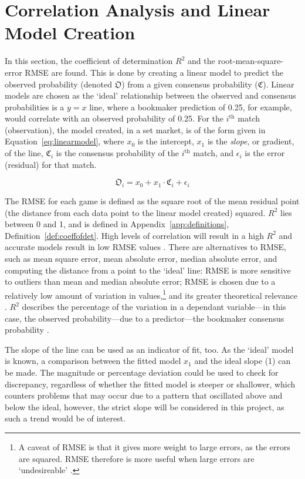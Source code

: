 \documentclass[a4paper,10pt]{report}
\begin{document}
\section{Correlation Analysis and Linear Model Creation}\label{sec:elitecorr}
In this section, the coefficient of determination $R^2$ and the root-mean-square-error RMSE are found. This is done by creating a linear model to predict the observed probability (denoted $\mathfrak{O}$) from a given consensus probability ($\mathfrak{C}$). Linear models are chosen as the `ideal' relationship between the observed and consensus probabilities is a $y=x$ line, where a bookmaker prediction of 0.25, for example, would correlate with an observed probability of 0.25. For the $i^{\textrm{th}}$ match (observation), the model created, in a set market, is of the form given in Equation~\ref{eq:linearmodel}, where $x_0$ is the intercept, $x_1$ is the \textit{slope}, or gradient, of the line, $\mathfrak{C}_i$ is the consensus probability of the $i^{\textrm{th}}$ match, and $\epsilon_i$ is the error (residual) for that match.

\begin{equation}\label{eq:linearmodel}
\mathfrak{O}_i = x_0 + x_1\cdot\mathfrak{C}_i + \epsilon_i
\end{equation}

The RMSE for each game is defined as the square root of the mean residual point (the distance from each data point to the linear model created) squared. $R^2$ lies between 0 and 1, and is defined in Appendix~\ref{app:definitions}, Definition~\ref{def:coeffofdet}. High levels of correlation will result in a high $R^2$ and accurate models result in low RMSE values \autocite{Mendenhall13}. There are alternatives to RMSE, such as mean square error, mean absolute error, median absolute error, and computing the distance from a point to the `ideal' line: RMSE is more sensitive to outliers than mean and median absolute error; RMSE is chosen due to a relatively low amount of variation in values,\footnote{A caveat of RMSE is that it gives more weight to large errors, as the errors are squared. RMSE therefore is more useful when large errors are `undesireable' \autocite{maevrmse}.} and its greater theoretical relevance \autocite{Hyndman06}. $R^2$ describes the percentage of the variation in a dependant variable---in this case, the observed probability---due to a predictor---the bookmaker consensus probability \autocite{Draper98}.

The slope of the line can be used as an indicator of fit, too. As the `ideal' model is known, a comparison between the fitted model $x_1$ and the ideal slope (1) can be made. The magnitude or percentage deviation could be used to check for discrepancy, regardless of whether the fitted model is steeper or shallower, which counters problems that may occur due to a pattern that oscillated above and below the ideal, however, the strict slope will be considered in this project, as such a trend would be of interest. \vspace{3mm}
\end{document}
